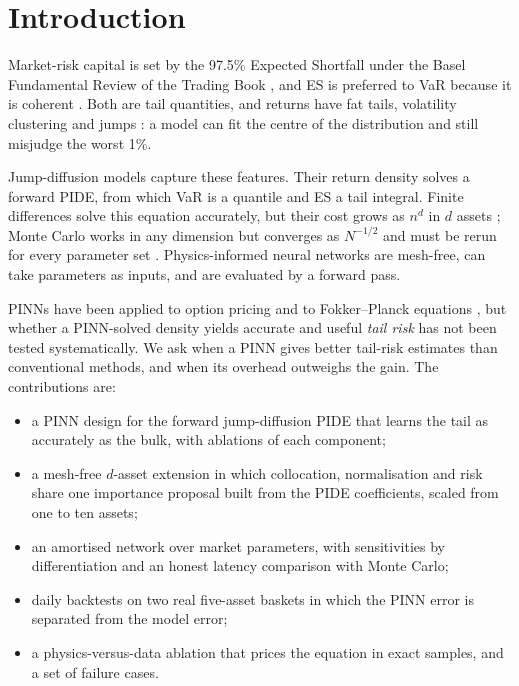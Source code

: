 \documentclass[conference]{IEEEtran}
\begin{document}
\section{Introduction}

Market-risk capital is set by the 97.5\% Expected Shortfall under the Basel Fundamental Review of the Trading
Book \cite{bcbs2019}, and ES is preferred to VaR because it is coherent \cite{artzner1999,acerbi2002}. Both are
tail quantities, and returns have fat tails, volatility clustering and jumps \cite{mandelbrot1963,cont2001}: a
model can fit the centre of the distribution and still misjudge the worst 1\%.

Jump-diffusion models \cite{merton1976,kou2002} capture these features. Their return density solves a forward
PIDE, from which VaR is a quantile and ES a tail integral. Finite differences solve this equation accurately, but
their cost grows as $n^d$ in $d$ assets \cite{andersen2000,cont2004}; Monte Carlo works in any dimension but
converges as $N^{-1/2}$ and must be rerun for every parameter set \cite{glasserman2003}. Physics-informed neural
networks \cite{raissi2019,karniadakis2021} are mesh-free, can take parameters as inputs, and are evaluated by a
forward pass.

PINNs have been applied to option pricing and to Fokker--Planck equations \cite{chen2021fp}, but whether a
PINN-solved density yields accurate and useful \emph{tail risk} has not been tested systematically. We ask when a
PINN gives better tail-risk estimates than conventional methods, and when its overhead outweighs the gain. The
contributions are:
\begin{itemize}
  \item a PINN design for the forward jump-diffusion PIDE that learns the tail as accurately as the bulk, with
        ablations of each component;
  \item a mesh-free $d$-asset extension in which collocation, normalisation and risk share one importance proposal
        built from the PIDE coefficients, scaled from one to ten assets;
  \item an amortised network over market parameters, with sensitivities by differentiation and an honest latency
        comparison with Monte Carlo;
  \item daily backtests on two real five-asset baskets in which the PINN error is separated from the model error;
  \item a physics-versus-data ablation that prices the equation in exact samples, and a set of failure cases.
\end{itemize}
\end{document}
